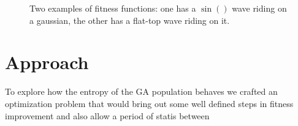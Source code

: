 \documentclass[11pt]{article}
\begin{document}
\begin{figure}
  \label{fig:fit-func_pid3095791}
  \centering
  \caption{Two examples of fitness functions: one has a $\sin()$ wave
    riding on a gaussian, the other has a flat-top wave riding on it.}
  \label{fig:multi-step}
\end{figure}


\section{Approach}
\label{sec:org8c588e5}

To explore how the entropy of the GA population behaves we crafted an
optimization problem that would bring out some well defined
steps in fitness improvement and also allow a period of statis between 
\end{document}
